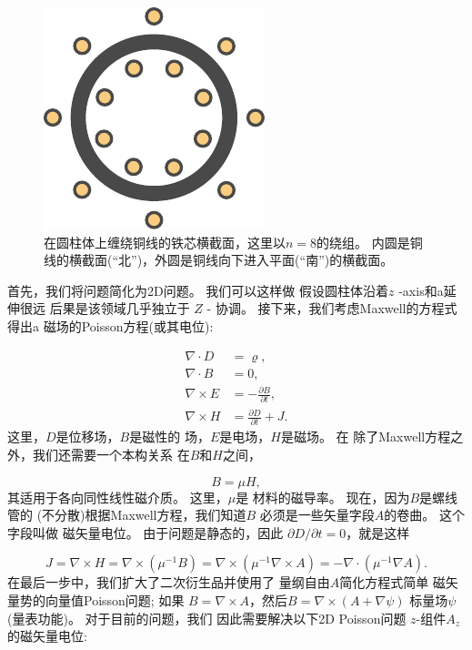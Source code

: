 \begin{figure}[!ht]  %
 \centerline{\includegraphics[width=0.5\linewidth]{fig/magnetostatics_geometry.pdf}}
 \caption{
 在圆柱体上缠绕铜线的铁芯横截面，这里以$n=8$的绕组。 内圆是铜线的横截面(“北”)，外圆是铜线向下进入平面(“南”)的横截面。\label{ftut1:fig:magnetostatics:geometry}
 }
\end{figure}

首先，我们将问题简化为2D问题。 我们可以这样做
假设圆柱体沿着$z$ -axis和a延伸很远
后果是该领域几乎独立于
$Z$ - 协调。 接下来，我们考虑Maxwell的方程式得出a
磁场的Poisson方程(或其电位):

\begin{align}
  \nabla\cdot  D &= \varrho, \\
  \nabla\cdot  B &= 0, \\
  \nabla\times E &= -\frac{\partial B}{\partial t}, \\
  \nabla\times H &= \frac{\partial D}{\partial t} + J.
\end{align}
这里，$D$是位移场，$B$是磁性的
场，$E$是电场，$H$是磁场。 在
除了Maxwell方程之外，我们还需要一个本构关系
在$B$和$H$之间，

\begin{equation}
  B = \mu H,
\end{equation}
其适用于各向同性线性磁介质。 这里，$\mu$是
材料的磁导率。 现在，因为$B$是螺线管的
(不分散)根据Maxwell方程，我们知道$B$
必须是一些矢量字段$A$的卷曲。 这个字段叫做
磁矢量电位。 由于问题是静态的，因此
$\partial D/\partial t = 0$，就是这样

\begin{equation}
  J = \nabla \times H
    = \nabla \times (\mu^{-1} B)
    = \nabla \times (\mu^{-1} \nabla \times A)
    = -\nabla \cdot (\mu^{-1} \nabla A).
\end{equation}
在最后一步中，我们扩大了二次衍生品并使用了
量纲自由$A$简化方程式简单
磁矢量势的向量值Poisson问题; 如果
$B = \nabla \times A$，然后$B = \nabla \times (A + \nabla \psi)$
标量场$\psi$(量表功能)。 对于目前的问题，我们
因此需要解决以下2D Poisson问题
$z$-组件$A_z$的磁矢量电位:

